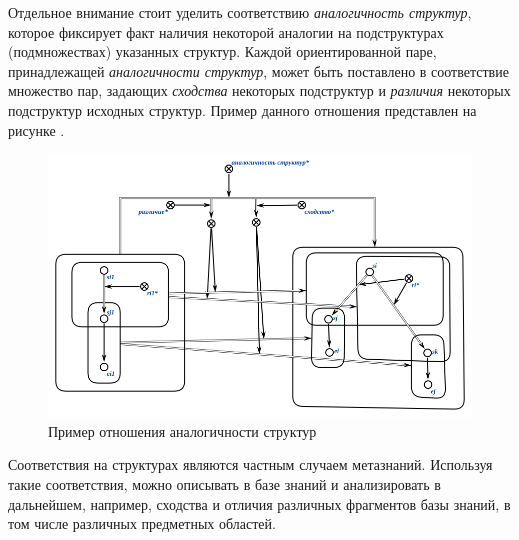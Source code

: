 \bigskip
Отдельное внимание стоит уделить соответствию \textit{аналогичность структур}, которое фиксирует факт наличия некоторой аналогии на подструктурах (подмножествах) указанных структур. Каждой ориентированной паре, принадлежащей \textit{аналогичности структур}, может быть поставлено в соответствие множество пар, задающих \textit{сходства} некоторых подструктур и \textit{различия} некоторых подструктур исходных структур. Пример данного отношения представлен на рисунке \textit{}.


\begin{SCn}



\end{SCn}

\begin{figure}[H]
	\includegraphics[scale=0.7]{author/part2/figures/chapter_kb/analogy.png}
	\caption{Пример отношения аналогичности структур}
	\label{fig:analogy_of_structures}
\end{figure}

Соответствия на структурах являются частным случаем метазнаний. Используя такие соответствия, можно описывать в базе знаний и анализировать в дальнейшем, например, сходства и отличия различных фрагментов базы знаний, в том числе различных предметных областей.

